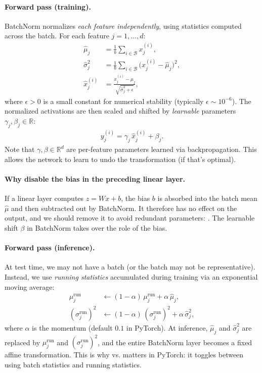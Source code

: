 \paragraph{Forward pass (training).}
BatchNorm normalizes \emph{each feature independently}, using statistics computed across the batch.
For each feature $j = 1, \dots, d$:
\begin{align}
	\hat{\mu}_j &= \frac{1}{b} \sum_{i \in \mathcal{B}} x_j^{(i)}, \\[4pt]
	\hat{\sigma}_j^2 &= \frac{1}{b} \sum_{i \in \mathcal{B}} \bigl(x_j^{(i)} - \hat{\mu}_j\bigr)^2, \\[4pt]
	\hat{x}_j^{(i)} &= \frac{x_j^{(i)} - \hat{\mu}_j}{\sqrt{\hat{\sigma}_j^2 + \epsilon}},
\end{align}
where $\epsilon > 0$ is a small constant for numerical stability (typically $\epsilon \sim 10^{-6}$).
The normalized activations are then scaled and shifted by \emph{learnable} parameters $\gamma_j, \beta_j \in \mathbb{R}$:
\begin{align}
	y_j^{(i)} = \gamma_j \, \hat{x}_j^{(i)} + \beta_j.
\end{align}
Note that $\gamma, \beta \in \mathbb{R}^d$ are per-feature parameters learned via backpropagation. This allows the network to learn to undo the transformation (if that's optimal).

\paragraph{Why disable the bias in the preceding linear layer.}
If a linear layer computes $z = Wx + b$, the bias $b$ is absorbed into the batch mean $\hat{\mu}$ and then subtracted out by BatchNorm.
It therefore has no effect on the output, and we should remove it to avoid redundant parameters: .
The learnable shift $\beta$ in BatchNorm takes over the role of the bias.

\paragraph{Forward pass (inference).}
At test time, we may not have a batch (or the batch may not be representative).
Instead, we use \emph{running statistics} accumulated during training via an exponential moving average:
\begin{align}
	\mu_j^{\text{run}} &\leftarrow (1 - \alpha)\,\mu_j^{\text{run}} + \alpha\,\hat{\mu}_j, \\[2pt]
	(\sigma_j^{\text{run}})^2 &\leftarrow (1 - \alpha)\,(\sigma_j^{\text{run}})^2 + \alpha\,\hat{\sigma}_j^2,
\end{align}
where $\alpha$ is the momentum (default $0.1$ in PyTorch).
At inference, $\hat{\mu}_j$ and $\hat{\sigma}_j^2$ are replaced by $\mu_j^{\text{run}}$ and $(\sigma_j^{\text{run}})^2$, and the entire BatchNorm layer becomes a fixed affine transformation.
This is why  vs.  matters in PyTorch: it toggles between using batch statistics and running statistics.


